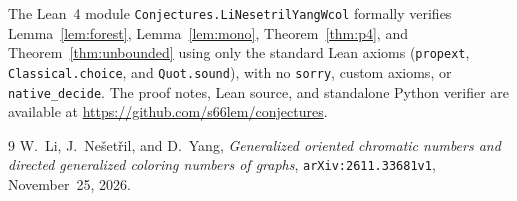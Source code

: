 \documentclass[11pt]{article}
\begin{document}
The Lean~4 module \texttt{Conjectures.LiNesetrilYangWcol} formally verifies Lemma~\ref{lem:forest}, Lemma~\ref{lem:mono}, Theorem~\ref{thm:p4}, and Theorem~\ref{thm:unbounded} using only the standard Lean axioms (\texttt{propext}, \texttt{Classical.choice}, and \texttt{Quot.sound}), with no \texttt{sorry}, custom axioms, or \texttt{native\_decide}. The proof notes, Lean source, and standalone Python verifier are available at \url{https://github.com/s66lem/conjectures}.

\begin{thebibliography}{9}
W.~Li, J.~Ne\v{s}et\v{r}il, and D.~Yang, \emph{Generalized oriented chromatic numbers and directed generalized coloring numbers of graphs}, \texttt{arXiv:2611.33681v1}, November~25, 2026.
\end{thebibliography}
\end{document}
